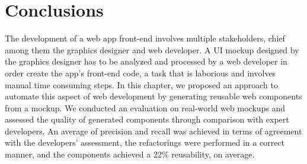 
\section{Conclusions}
\label{section:conclusions}
The development of a web app front-end involves multiple stakeholders, chief among them the graphics designer and web developer. A UI mockup designed by the graphics designer has to be analyzed and processed by a web developer in order create the app's front-end code, a task that is laborious and involves manual time consuming steps. In this chapter, we proposed an approach to automate this aspect of web development by generating reusable web components from a mockup. We conducted an evaluation on real-world web mockups and assessed the quality of generated components through comparison with expert developers. An average of \precision precision and \recall recall was achieved in terms of agreement with the developers' assessment, the refactorings were performed in a correct manner, and the components achieved a 22\% reusability, on average.
